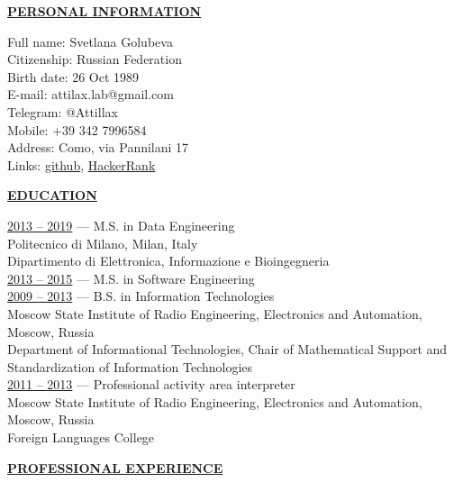 \documentclass[a4paper,10pt,fullpage]{article}
\begin{document}
\begin{center}
	\underline{\textbf{PERSONAL INFORMATION}}
\end{center}

Full name: \hfill Svetlana Golubeva\\
Citizenship: \hfill Russian Federation\\
Birth date: \hfill 26 Oct 1989\\
E-mail: \hfill attilax.lab@gmail.com \\
Telegram: \hfill @Attillax \\
Mobile: \hfill +39 342 7996584 \\
Address: \hfill Como, via Pannilani 17\\
Links: \hfill  \href{https://github.com/attillax}{github}, 
\href{https://www.hackerrank.com/attillax}{HackerRank}\\

\begin{center}
	\underline{\textbf{EDUCATION}}
\end{center}	

\underline{2013 -- 2019} --- M.S. in Data Engineering \\
Politecnico di Milano, Milan, Italy\\
Dipartimento di Elettronica, Informazione e Bioingegneria\\

\underline{2013 -- 2015} --- M.S. in Software Engineering \\
\underline{2009 -- 2013} --- B.S. in Information Technologies \\
Moscow State Institute of Radio Engineering, Electronics and Automation, Moscow,
 Russia\\
Department of Informational Technologies, Chair of Mathematical Support and 
Standardization of Information Technologies\\

\underline{2011 -- 2013} --- Professional activity area interpreter \\
Moscow State Institute of Radio Engineering, Electronics and Automation, Moscow,
 Russia\\
Foreign Languages College\\

\begin{center}
	\underline{\textbf{PROFESSIONAL EXPERIENCE}}
\end{center}	
\end{document}
